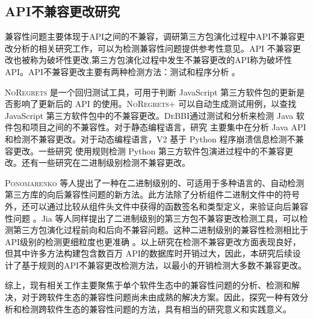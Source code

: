 \subsection{API不兼容更改研究}
兼容性问题主要体现于API之间的不兼容，调研第三方包演化过程中API不兼容更改分析的相关研究工作，可以为检测兼容性问题提供参考性意见。API 不兼容更改也被称为破坏性更改,第三方包演化过程中发生不兼容更改的API称为破坏性API。API不兼容更改主要有两种检测方法：测试和程序分析 。

\textsc{NoRegrets} 是一个回归测试工具，可用于判断 JavaScript 第三方软件包的更新是否影响了更新后的 API 的使用。\textsc{NoRegrets+} 可以自动生成测试用例，以查找 JavaScript 第三方软件包中的不兼容更改。\textsc{DeBBI}通过测试和分析来检测 Java 软件包和项目之间的不兼容性。对于静态编程语言，研究 主要集中在分析 Java API 和检测不兼容更改。对于动态编程语言，\textsc{V2}  基于 Python 程序崩溃信息检测不兼容更改。一些研究 使用规则检测 Python 第三方软件包演进过程中的不兼容更改。还有一些研究在二进制级别检测不兼容更改。

\textsc{Ponomarenko} 等人提出了一种在二进制级别的、可适用于多种语言的、自动检测第三方库的向后兼容性问题的新方法。此方法除了分析组件二进制文件中的符号外，还可以通过比较从组件头文件中获得的函数签名和类型定义，来验证向后兼容性问题 。Jia 等人同样提出了二进制级别的第三方包不兼容更改检测工具，可以检测第三方包演化过程前向和后向不兼容问题。这种二进制级别的兼容性检测相比于API级别的检测更细粒度也更准确 。以上研究在检测不兼容更改方面表现良好，但其中许多方法构建包含数百万 API的数据库时开销过大，因此，本研究后续设计了基于规则的API不兼容更改检测方法，以最小的开销检测大多数不兼容更改。

综上，现有相关工作主要聚焦于单个软件生态中的兼容性问题的分析、检测和解决，对于跨软件生态的兼容性问题尚未由成熟的解决方案。因此，探究一种有效分析和检测跨软件生态的兼容性问题的方法，具有相当的研究意义和实践意义。


